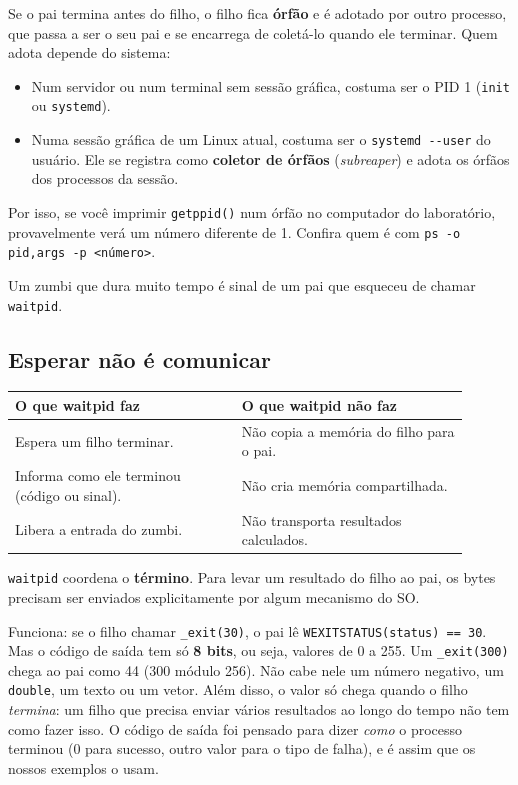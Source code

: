 \documentclass[11pt,a4paper]{article}
\newcommand{\cmd}[1]{\texttt{#1}}
\begin{document}
Se o pai termina antes do filho, o filho fica \textbf{órfão} e é adotado por outro processo, que passa a ser o seu pai e se encarrega de coletá-lo quando ele terminar. Quem adota depende do sistema:

\begin{itemize}
    \item Num servidor ou num terminal sem sessão gráfica, costuma ser o PID 1 (\cmd{init} ou \cmd{systemd}).
    \item Numa sessão gráfica de um Linux atual, costuma ser o \cmd{systemd -{}-user} do usuário. Ele se registra como \textbf{coletor de órfãos} (\emph{subreaper}) e adota os órfãos dos processos da sessão.
\end{itemize}

Por isso, se você imprimir \cmd{getppid()} num órfão no computador do laboratório, provavelmente verá um número diferente de 1. Confira quem é com \cmd{ps -o pid,args -p <número>}.

Um zumbi que dura muito tempo é sinal de um pai que esqueceu de chamar \cmd{waitpid}.

\subsection{Esperar não é comunicar}

\begin{center}
\begin{tabular}{@{}p{0.45\linewidth}p{0.45\linewidth}@{}}
\toprule
\textbf{O que waitpid faz} & \textbf{O que waitpid não faz} \\
\midrule
Espera um filho terminar. & Não copia a memória do filho para o pai. \\
Informa como ele terminou (código ou sinal). & Não cria memória compartilhada. \\
Libera a entrada do zumbi. & Não transporta resultados calculados. \\
\bottomrule
\end{tabular}
\end{center}

\begin{definicao}
\cmd{waitpid} coordena o \textbf{término}. Para levar um resultado do filho ao pai, os bytes precisam ser enviados explicitamente por algum mecanismo do SO.
\end{definicao}

\begin{pergunta}
Funciona: se o filho chamar \cmd{\_exit(30)}, o pai lê \cmd{WEXITSTATUS(status) == 30}. Mas o código de saída tem só \textbf{8 bits}, ou seja, valores de 0 a 255. Um \cmd{\_exit(300)} chega ao pai como 44 (300 módulo 256). Não cabe nele um número negativo, um \cmd{double}, um texto ou um vetor. Além disso, o valor só chega quando o filho \emph{termina}: um filho que precisa enviar vários resultados ao longo do tempo não tem como fazer isso. O código de saída foi pensado para dizer \emph{como} o processo terminou (0 para sucesso, outro valor para o tipo de falha), e é assim que os nossos exemplos o usam.
\end{pergunta}
\end{document}
